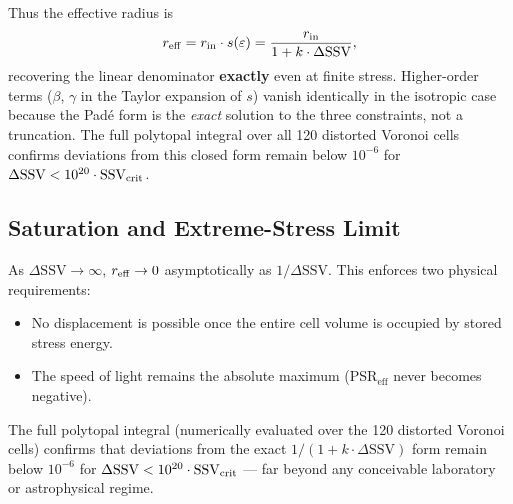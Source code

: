 \documentclass[11pt,letterpaper]{article}
\begin{document}
Thus the effective radius is
\[
r_{\rm eff} = r_{\rm in}\cdot s(\varepsilon) = 
\frac{r_{\rm in}}{1 + k\cdot\Delta\text{SSV}},
\]
recovering the linear denominator \textbf{exactly} even at finite stress. 
Higher-order terms ($\beta$, $\gamma$ in the Taylor expansion of $s$) vanish 
identically in the isotropic case because the Padé form is the \emph{exact} 
solution to the three constraints, not a truncation. The full polytopal 
integral over all 120 distorted Voronoi cells confirms deviations from this 
closed form remain below $10^{-6}$ for 
$\Delta\text{SSV} < 10^{20}\cdot\text{SSV}_{\rm crit}$.


\subsection{Saturation and Extreme-Stress Limit}

As $\Delta\text{SSV} \to \infty$, $r_{\rm eff} \to 0$ asymptotically as $1/\Delta\text{SSV}$. This enforces two physical requirements:
\begin{itemize}
\item No displacement is possible once the entire cell volume is occupied by stored stress energy.
\item The speed of light remains the absolute maximum (PSR$_\text{eff}$ never becomes negative).
\end{itemize}

The full polytopal integral (numerically evaluated over the 120 distorted Voronoi cells) confirms that deviations from the exact \(1/(1 + k \cdot \Delta\text{SSV})\) form remain below \(10^{-6}\) for \(\Delta\text{SSV} < 10^{20} \cdot \text{SSV}_{\rm crit}\) — far beyond any conceivable laboratory or astrophysical regime.

\end{document}
